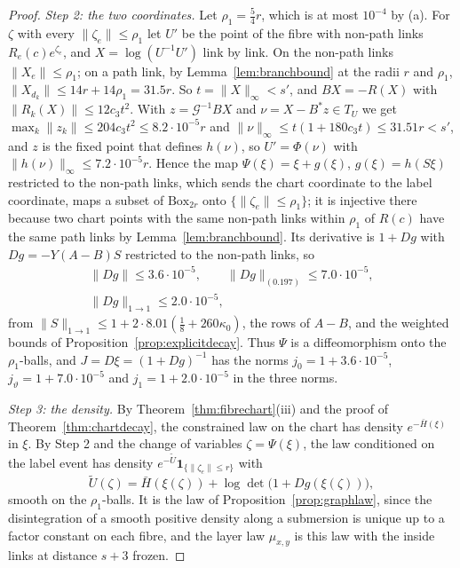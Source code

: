 \documentclass[11pt]{amsart}
\theoremstyle{definition}
\theoremstyle{remark}
\numberwithin{equation}{section}
\begin{document}
\begin{proof}
\emph{Step 2: the two coordinates.} Let $\rho_1=\frac54r$, which is at
most $10^{-4}$ by (a). For $\zeta$ with every $\lVert\zeta_e\rVert\le
\rho_1$ let $U'$ be the point of the fibre with non-path links
$R_e(c)e^{\zeta_e}$, and $X=\log(U^{-1}U')$ link by link. On the non-path
links $\lVert X_e\rVert\le\rho_1$; on a path link, by
Lemma~\ref{lem:branchbound} at the radii $r$ and $\rho_1$,
$\lVert X_{d_k}\rVert\le14r+14\rho_1=31.5r$. So $t=\lVert X\rVert_\infty
<s'$, and $BX=-R(X)$ with $\lVert R_k(X)\rVert\le12c_3t^2$. With
$z=\mathcal G^{-1}BX$ and $\nu=X-B^*z\in T_U$ we get $\max_k\lVert z_k
\rVert\le204c_3t^2\le8.2\cdot10^{-5}r$ and $\lVert\nu\rVert_\infty\le
t(1+180c_3t)\le31.51r<s'$, and $z$ is the fixed point that defines
$h(\nu)$, so $U'=\Phi(\nu)$ with $\lVert h(\nu)\rVert_\infty\le
7.2\cdot10^{-5}r$. Hence the map $\Psi(\xi)=\xi+g(\xi)$,
$g(\xi)=h(S\xi)$ restricted to the non-path links, which sends the chart
coordinate to the label coordinate, maps a subset of
$\mathrm{Box}_{2r}$ onto $\{\lVert\zeta_e\rVert\le\rho_1\}$; it is
injective there because two chart points with the same non-path links
within $\rho_1$ of $R(c)$ have the same path links by
Lemma~\ref{lem:branchbound}. Its derivative is $1+Dg$ with
$Dg=-Y(A-B)S$ restricted to the non-path links, so
\[
\begin{gathered}
\lVert Dg\rVert\le3.6\cdot10^{-5},\qquad\lVert Dg\rVert_{(0.197)}\le
7.0\cdot10^{-5},\\
\lVert Dg\rVert_{1\to1}\le2.0\cdot10^{-5},
\end{gathered}
\]
from $\lVert S\rVert_{1\to1}\le1+2\cdot8.01(\frac18+260\kappa_0)$, the
rows of $A-B$, and the weighted bounds of
Proposition~\ref{prop:explicitdecay}. Thus $\Psi$ is a diffeomorphism
onto the $\rho_1$-balls, and $J=D\xi=(1+Dg)^{-1}$ has the norms
$j_0=1+3.6\cdot10^{-5}$, $j_\vartheta=1+7.0\cdot10^{-5}$ and
$j_1=1+2.0\cdot10^{-5}$ in the three norms.

\emph{Step 3: the density.} By Theorem~\ref{thm:fibrechart}(iii) and the
proof of Theorem~\ref{thm:chartdecay}, the constrained law on the chart
has density $e^{-\bar H(\xi)}$ in $\xi$. By Step 2 and the change of
variables $\zeta=\Psi(\xi)$, the law conditioned on the label event has
density $e^{-\tilde U}\mathbf 1_{\{\lVert\zeta_e\rVert\le r\}}$ with
\[
\tilde U(\zeta)=\bar H(\xi(\zeta))+\log\det\bigl(1+Dg(\xi(\zeta))\bigr),
\]
smooth on the $\rho_1$-balls. It is the law of
Proposition~\ref{prop:graphlaw}, since the disintegration of a smooth
positive density along a submersion is unique up to a factor constant on
each fibre, and the layer law $\mu_{x,y}$ is this law with the inside
links at distance $s+3$ frozen.


\end{proof}
\end{document}
